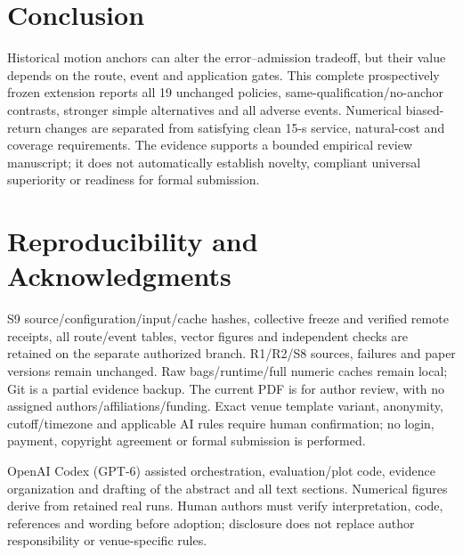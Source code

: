 \documentclass[conference]{IEEEtran}
\begin{document}
\section{Conclusion}
Historical motion anchors can alter the error--admission tradeoff, but their value depends on the route, event and application gates. This complete prospectively frozen extension reports all 19 unchanged policies, same-qualification/no-anchor contrasts, stronger simple alternatives and all adverse events. Numerical biased-return changes are separated from satisfying clean 15-s service, natural-cost and coverage requirements. The evidence supports a bounded empirical review manuscript; it does not automatically establish novelty, compliant universal superiority or readiness for formal submission.

\section*{Reproducibility and Acknowledgments}
S9 source/configuration/input/cache hashes, collective freeze and verified remote receipts, all route/event tables, vector figures and independent checks are retained on the separate authorized branch. R1/R2/S8 sources, failures and paper versions remain unchanged. Raw bags/runtime/full numeric caches remain local; Git is a partial evidence backup. The current PDF is for author review, with no assigned authors/affiliations/funding. Exact venue template variant, anonymity, cutoff/timezone and applicable AI rules require human confirmation; no login, payment, copyright agreement or formal submission is performed.

OpenAI Codex (GPT-6) assisted orchestration, evaluation/plot code, evidence organization and drafting of the abstract and all text sections. Numerical figures derive from retained real runs. Human authors must verify interpretation, code, references and wording before adoption; disclosure does not replace author responsibility or venue-specific rules.

\end{document}

